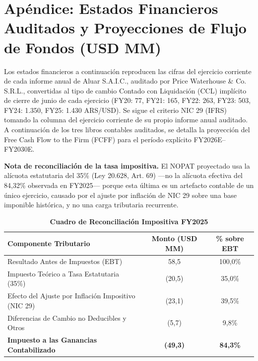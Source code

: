 \documentclass[10pt,a4paper]{article}
\begin{document}
\section*{Ap\'endice: Estados Financieros Auditados y Proyecciones de Flujo de Fondos (USD MM)}
\label{sec:apendice-eeff-fcff}

{\small Los estados financieros a continuaci\'on reproducen las cifras del ejercicio corriente de cada informe anual de Aluar S.A.I.C., auditado por Price Waterhouse \& Co. S.R.L., convertidas al tipo de cambio Contado con Liquidaci\'on (CCL) impl\'icito de cierre de junio de cada ejercicio (FY20: 77, FY21: 165, FY22: 263, FY23: 503, FY24: 1.350, FY25: 1.430 ARS/USD). Se sigue el criterio NIC 29 (IFRS) tomando la columna del ejercicio corriente de su propio informe anual auditado. A continuaci\'on de los tres libros contables auditados, se detalla la proyecci\'on del Free Cash Flow to the Firm (FCFF) para el per\'iodo expl\'icito FY2026E--FY2030E.}

{\small \textbf{Nota de reconciliaci\'on de la tasa impositiva.} El NOPAT proyectado usa la al\'icuota estatutaria del 35\% (Ley 20.628, Art. 69) ---no la al\'icuota efectiva del 84,32\% observada en FY2025--- porque esta \'ultima es un artefacto contable de un \'unico ejercicio, causado por el ajuste por inflaci\'on de NIC 29 sobre una base imponible hist\'orica, y no una carga tributaria recurrente.}

\vspace{0.15cm}
\begin{table}[H]
\centering
\caption{\textbf{Cuadro de Reconciliación Impositiva FY2025}}
\small
\begin{tabular}{lcc}
\toprule
\textbf{Componente Tributario} & \textbf{Monto (USD MM)} & \textbf{\% sobre EBT} \\
\midrule
Resultado Antes de Impuestos (EBT) & 58,5 & 100,0\% \\
Impuesto Teórico a Tasa Estatutaria (35\%) & (20,5) & 35,0\% \\
Efecto del Ajuste por Inflación Impositivo (NIC 29) & (23,1) & 39,5\% \\
Diferencias de Cambio no Deducibles y Otros & (5,7) & 9,8\% \\
\midrule
\textbf{Impuesto a las Ganancias Contabilizado} & \textbf{(49,3)} & \textbf{84,3\%} \\
\bottomrule
\end{tabular}
\end{table}
\end{document}
